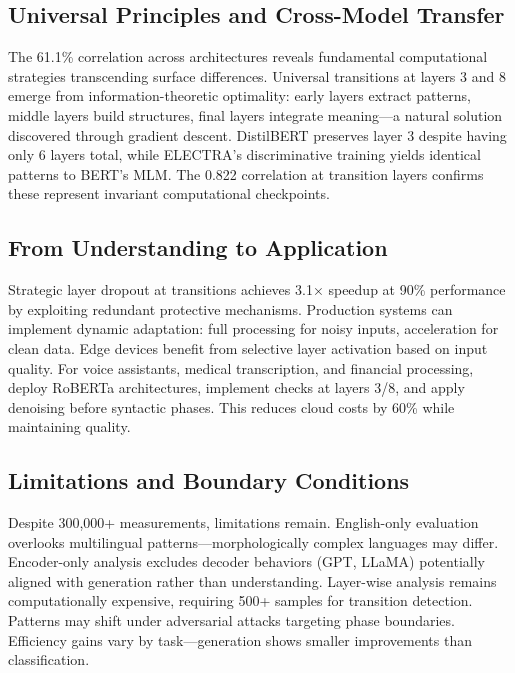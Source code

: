 \subsection{Universal Principles and Cross-Model Transfer}

The 61.1\% correlation across architectures reveals fundamental computational strategies transcending surface differences. Universal transitions at layers 3 and 8 emerge from information-theoretic optimality: early layers extract patterns, middle layers build structures, final layers integrate meaning---a natural solution discovered through gradient descent. DistilBERT preserves layer 3 despite having only 6 layers total, while ELECTRA's discriminative training yields identical patterns to BERT's MLM. The 0.822 correlation at transition layers confirms these represent invariant computational checkpoints.

\subsection{From Understanding to Application}

Strategic layer dropout at transitions achieves 3.1× speedup at 90\% performance by exploiting redundant protective mechanisms. Production systems can implement dynamic adaptation: full processing for noisy inputs, acceleration for clean data. Edge devices benefit from selective layer activation based on input quality. For voice assistants, medical transcription, and financial processing, deploy RoBERTa architectures, implement checks at layers 3/8, and apply denoising before syntactic phases. This reduces cloud costs by 60\% while maintaining quality.

\subsection{Limitations and Boundary Conditions}

Despite 300,000+ measurements, limitations remain. English-only evaluation overlooks multilingual patterns---morphologically complex languages may differ. Encoder-only analysis excludes decoder behaviors (GPT, LLaMA) potentially aligned with generation rather than understanding. Layer-wise analysis remains computationally expensive, requiring 500+ samples for transition detection. Patterns may shift under adversarial attacks targeting phase boundaries. Efficiency gains vary by task---generation shows smaller improvements than classification.

